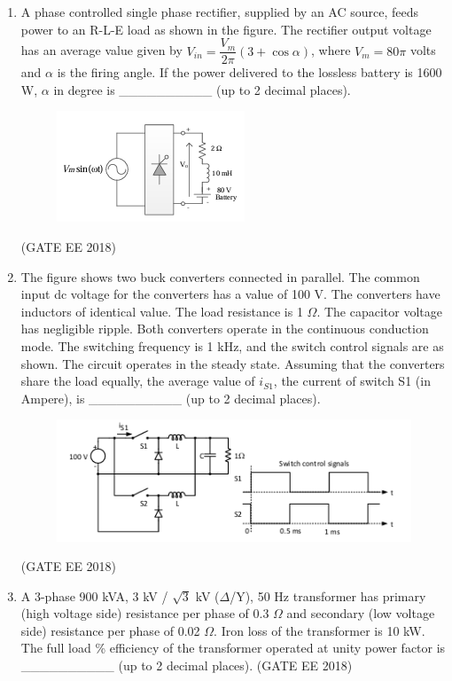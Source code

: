 \documentclass[journal,12pt,onecolumn]{IEEEtran}
\theoremstyle{remark}
\begin{document}
\begin{enumerate}
\item A phase controlled single phase rectifier, supplied by an AC source, feeds power to an R-L-E load as shown in the figure. The rectifier output voltage has an average value given by $V_{in} = \dfrac{V_m}{2\pi} (3 + \cos\alpha)$, where $V_m = 80\pi$ volts and $\alpha$ is the firing angle. If the power delivered to the lossless battery is 1600 W, $\alpha$ in degree is \_\_\_\_\_\_\_\_\_\_ (up to 2 decimal places).
\begin{figure}[H]
    \centering
    \includegraphics[]{figs/Q.49.png}
    \caption{}
    \label{fig:22}
\end{figure}
\hfill{(GATE EE 2018)}

\item The figure shows two buck converters connected in parallel. The common input dc voltage for the converters has a value of 100 V. The converters have inductors of identical value. The load resistance is 1 $\Omega$. The capacitor voltage has negligible ripple. Both converters operate in the continuous conduction mode. The switching frequency is 1 kHz, and the switch control signals are as shown. The circuit operates in the steady state. Assuming that the converters share the load equally, the average value of $i_{S1}$, the current of switch S1 (in Ampere), is \_\_\_\_\_\_\_\_\_\_ (up to 2 decimal places).
\begin{figure}[H]
    \centering
    \includegraphics[]{figs/Q.50.png}
    \caption{}
    \label{fig:23}
\end{figure}
\hfill{(GATE EE 2018)}

\item A 3-phase 900 kVA, 3 kV / $\sqrt{3}$ kV ($\Delta$/Y), 50 Hz transformer has primary (high voltage side) resistance per phase of 0.3 $\Omega$ and secondary (low voltage side) resistance per phase of 0.02 $\Omega$. Iron loss of the transformer is 10 kW. The full load \% efficiency of the transformer operated at unity power factor is \_\_\_\_\_\_\_\_\_\_ (up to 2 decimal places).
\hfill{(GATE EE 2018)}


\end{enumerate}
\end{document}
